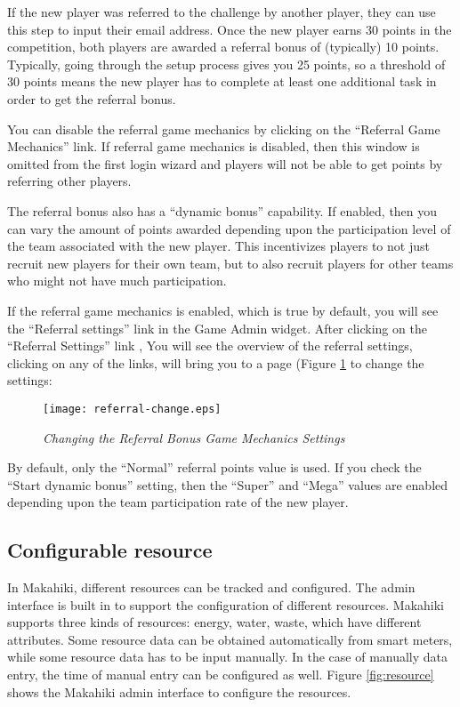 If the new player was referred to the challenge by another player, they can use this step to input their email address. Once the new player earns 30 points in the competition, both players are awarded a referral bonus of (typically) 10 points. Typically, going through the setup process gives you 25 points, so a threshold of 30 points means the new player has to complete at least one additional task in order to get the referral bonus.

You can disable the referral game mechanics by clicking on the ``Referral Game Mechanics'' link. If referral game mechanics is disabled, then this window is omitted from the first login wizard and players will not be able to get points by referring other players.

The referral bonus also has a ``dynamic bonus'' capability. If enabled, then you can vary the amount of points awarded depending upon the participation level of the team associated with the new player. This incentivizes players to not just recruit new players for their own team, but to also recruit players for other teams who might not have much participation.

If the referral game mechanics is enabled, which is true by default, you will see the ``Referral settings'' link in the Game Admin widget. After clicking on the ``Referral Settings'' link , You will see the overview of the referral settings, clicking on any of the links, will bring you to a page (Figure \ref{fig:referral-change} to change the settings:

\begin{figure}[!ht]
  \center
  \texttt{[image: referral-change.eps]}
  \caption{\em Changing the Referral Bonus Game Mechanics Settings}
  \label{fig:referral-change}
\end{figure}

By default, only the ``Normal'' referral points value is used. If you check the ``Start dynamic bonus'' setting, then the ``Super'' and ``Mega'' values are enabled depending upon the team participation rate of the new player.

\clearpage

\subsection{Configurable resource}
In Makahiki, different resources can be tracked and configured. The admin interface is built in to support the configuration of different resources. Makahiki supports three kinds of resources: energy, water, waste, which have different attributes. Some resource data can be obtained automatically from smart meters, while some resource data has to be input manually. In the case of manually data entry, the time of manual entry can be configured as well. Figure \ref{fig:resource} shows the Makahiki admin interface to configure the resources.

